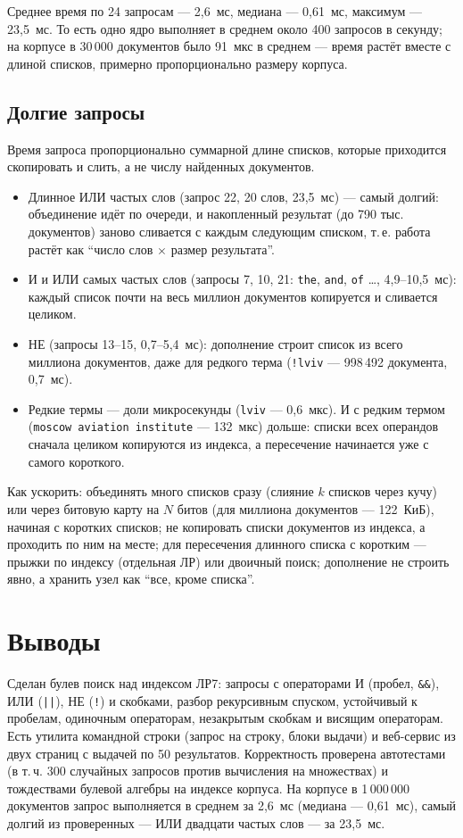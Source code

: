Среднее время по 24 запросам --- 2,6~мс, медиана --- 0,61~мс, максимум --- 23,5~мс. То есть одно ядро выполняет в среднем около 400 запросов в секунду; на корпусе в 30\,000 документов было 91~мкс в среднем --- время растёт вместе с длиной списков, примерно пропорционально размеру корпуса.

\subsection{Долгие запросы}
Время запроса пропорционально суммарной длине списков, которые приходится скопировать и слить, а не числу найденных документов.
\begin{itemize}
    \item Длинное ИЛИ частых слов (запрос 22, 20 слов, 23,5~мс) --- самый долгий: объединение идёт по очереди, и накопленный результат (до 790 тыс. документов) заново сливается с каждым следующим списком, т.\,е. работа растёт как \enquote{число слов $\times$ размер результата}.
    \item И и ИЛИ самых частых слов (запросы 7, 10, 21: \texttt{the}, \texttt{and}, \texttt{of} \ldots, 4,9--10,5~мс): каждый список почти на весь миллион документов копируется и сливается целиком.
    \item НЕ (запросы 13--15, 0,7--5,4~мс): дополнение строит список из всего миллиона документов, даже для редкого терма (\texttt{!lviv} --- 998\,492 документа, 0,7~мс).
    \item Редкие термы --- доли микросекунды (\texttt{lviv} --- 0,6~мкс). И с редким термом (\texttt{moscow aviation institute} --- 132~мкс) дольше: списки всех операндов сначала целиком копируются из индекса, а пересечение начинается уже с самого короткого.
\end{itemize}
Как ускорить: объединять много списков сразу (слияние $k$ списков через кучу) или через битовую карту на $N$ битов (для миллиона документов --- 122~КиБ), начиная с коротких списков; не копировать списки документов из индекса, а проходить по ним на месте; для пересечения длинного списка с коротким --- прыжки по индексу (отдельная ЛР) или двоичный поиск; дополнение не строить явно, а хранить узел как \enquote{все, кроме списка}.

\section{Выводы}
Сделан булев поиск над индексом ЛР7: запросы с операторами И (пробел, \texttt{\&\&}), ИЛИ (\texttt{||}), НЕ (\texttt{!}) и скобками, разбор рекурсивным спуском, устойчивый к пробелам, одиночным операторам, незакрытым скобкам и висящим операторам. Есть утилита командной строки (запрос на строку, блоки выдачи) и веб-сервис из двух страниц с выдачей по 50 результатов. Корректность проверена автотестами (в т.\,ч. 300 случайных запросов против вычисления на множествах) и тождествами булевой алгебры на индексе корпуса. На корпусе в 1\,000\,000 документов запрос выполняется в среднем за 2,6~мс (медиана --- 0,61~мс), самый долгий из проверенных --- ИЛИ двадцати частых слов --- за 23,5~мс.

